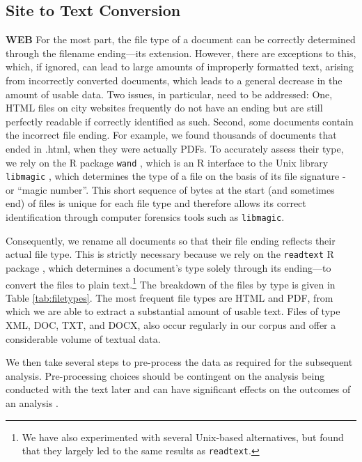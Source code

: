 \documentclass[11pt]{article}
\begin{document}
\subsection{Site to Text Conversion}
{\bf WEB}
For the most part, the file type of a document can be correctly determined through the filename ending---its extension. However, there are exceptions to this, which, if ignored, can lead to large amounts of improperly formatted text, arising from incorrectly converted documents, which leads to a general decrease in the amount of usable data. Two issues, in particular, need to be addressed: One, HTML files on city websites frequently do not have an ending but are still perfectly readable if correctly identified as such. Second, some documents contain the incorrect file ending. For example, we found thousands of documents that ended in .html, when they were actually PDFs. To accurately assess their type, we rely on the R package \texttt{wand} \citep{wand}, which is an R interface to the Unix library \texttt{libmagic} \citep{darwin2008libmagic}, which determines the type of a file on the basis of its file signature - or ``magic number''. This short sequence of bytes at the start (and sometimes end) of files is unique for each file type and therefore allows its correct identification through computer forensics tools such as \texttt{libmagic}.

Consequently, we rename all documents so that their file ending reflects their actual file type. This is strictly necessary because we rely on the \texttt{readtext} R package \citep{readtext}, which determines a document's type solely through its ending---to convert the files to plain text.\footnote{We have also experimented with several Unix-based alternatives, but found that they largely led to the same results as \texttt{readtext}.} The breakdown of the files by type is given in Table \ref{tab:filetypes}. The most frequent file types are HTML and PDF, from which we are able to extract a substantial amount of usable text. Files of type XML, DOC, TXT, and DOCX, also occur regularly in our corpus and offer a considerable volume of textual data.






We then take several steps to pre-process the data as required for the subsequent analysis. Pre-processing choices should be contingent on the analysis being conducted with the text later and can have significant effects on the outcomes of an analysis \citep{denny2018text}. %
\end{document}

